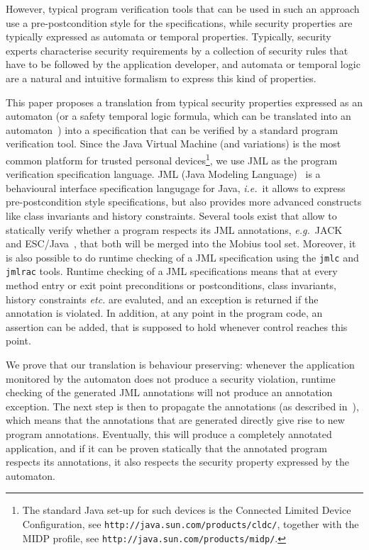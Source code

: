 \documentclass[]{llncs}
\begin{document}
However, typical program verification tools that can be used in such
an approach use a pre-postcondition style for the specifications,
while security properties are typically expressed as automata or
temporal properties. Typically, security experts characterise security
requirements by a collection of security rules that have to be
followed by the application developer, and automata or temporal logic
are a natural and intuitive formalism to express this kind of
properties. 

This paper proposes a translation from typical security
properties expressed as an automaton (or a safety temporal logic
formula, which can be translated into an automaton~\cite{Wolper?}) 
into a specification that can be verified by a standard program
verification tool. Since the Java Virtual Machine (and variations) is
the most common platform for trusted personal devices\footnote{The
standard Java set-up for such devices is the Connected Limited Device
Configuration, see \texttt{http://java.sun.com/products/cldc/},
together with the MIDP profile, see
\texttt{http://java.sun.com/products/midp/}.}, we use JML as the
program verification specification language.  JML (Java Modeling
Language)~\cite{Leavens...} is a behavioural interface specification
langugage for Java, \emph{i.e.}\ it allows to express
pre-postcondition style specifications, but also provides more
advanced constructs like class invariants and history
constraints. Several tools exist that allow to statically verify
whether a program respects its JML annotations, \emph{e.g.}\
JACK~\cite{} and  ESC/Java~\cite{CokK04}, that both will be merged
into the \textsf{Mobius} tool set. Moreover, it is also possible to do
runtime checking of a JML specification using the \texttt{jmlc} and
\texttt{jmlrac} tools. Runtime checking of a JML specifications means
that at every method entry or exit point preconditions or
postconditions, class invariants, history constraints \emph{etc.} are
evaluted, and an exception is returned if the annotation is
violated. In addition, at any point in the program code, an assertion
can be added, that is supposed to hold whenever control reaches this
point.

We prove that our translation is behaviour preserving: whenever the
application monitored by the automaton does not produce a security
violation, runtime checking of the generated JML annotations will 
not produce an annotation exception. The next step is then to
propagate the annotations (as described
in~\cite{PavlovaBBHL04cardis}), which means that the annotations that
are generated directly give rise to new program
annotations. Eventually, this will produce a completely annotated
application, and if it can be proven statically that the annotated
program respects its annotations, it also respects the security
property expressed by the automaton.
\end{document}
